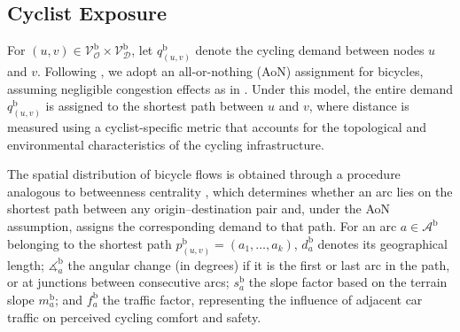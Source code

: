 \documentclass[lettersize,journal]{IEEEtran}
\begin{document}
\subsection{Cyclist Exposure}
\label{cyclist_exposure}
For $(u, v) \in \mathcal{V}_{\mathcal{O}}^\mathrm{b}\times \mathcal{V}_{\mathcal{D}}^\mathrm{b}$, let 
$q_{(u,v)}^\mathrm{b}$ denote the cycling demand between nodes $u$ and $v$. Following
\cite{mesbah2012bilevel}, we adopt an all-or-nothing (AoN) assignment for bicycles,
assuming negligible congestion effects as in \cite{cooper2017using}. Under this model, the entire demand
$q_{(u,v)}^\mathrm{b}$ is assigned to the shortest path between $u$ and $v$, where
distance is measured using a cyclist-specific metric that accounts for the
topological and environmental characteristics of the cycling infrastructure.

The spatial distribution of bicycle flows is obtained through a procedure
analogous to betweenness centrality \cite{jurado2025improving}, which determines
whether an arc lies on the shortest path between any origin--destination pair
and, under the AoN assumption, assigns the corresponding demand to that path.
For an arc $a \in \mathcal{A}^\mathrm{b}$ belonging to the shortest path
$p_{(u,v)}^\mathrm{b} = (a_{1}, \ldots, a_{k})$, $d_{a}^\mathrm{b}$ denotes its
geographical length; $\measuredangle_{a}^\mathrm{b}$ the angular change (in degrees)
if it is the first or last arc in the path, or at junctions between consecutive
arcs; $s_{a}^\mathrm{b}$ the slope factor based on the terrain slope
$m_{a}^\mathrm{b}$; and $f_{a}^\mathrm{b}$ the traffic factor, representing the
influence of adjacent car traffic on perceived cycling comfort and safety.
\end{document}

